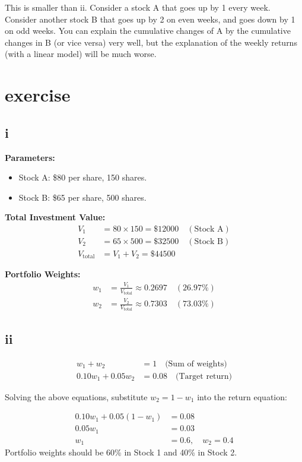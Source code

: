 \documentclass{article}
\begin{document}
This is smaller than ii.
Consider a stock A that goes up by 1 every week.
Consider another stock B that goes up by 2 on even weeks,
and goes down by 1 on odd weeks.
You can explain the cumulative changes of A
by the cumulative changes in B (or vice versa) very well,
but the explanation of the weekly returns (with a linear model) will be much worse.
\section{exercise}
\subsection*{i}
\textbf{Parameters:}
\begin{itemize}
    \item Stock A: \$80 per share, 150 shares.
    \item Stock B: \$65 per share, 500 shares.
\end{itemize}

\textbf{Total Investment Value:}
\begin{align*}
    V_1              & = 80 \times 150 = \$12000 \quad (\text{Stock A}) \\
    V_2              & = 65 \times 500 = \$32500 \quad (\text{Stock B}) \\
    V_{\text{total}} & = V_1 + V_2 = \$44500
\end{align*}

\textbf{Portfolio Weights:}
\begin{align*}
    w_1 & = \frac{V_1}{V_{\text{total}}} \approx 0.2697 \quad (\text{26.97\%}) \\
    w_2 & = \frac{V_2}{V_{\text{total}}} \approx 0.7303 \quad (\text{73.03\%})
\end{align*}
\subsection*{ii}
\begin{align*}
    w_1 + w_2         & = 1 \quad \text{(Sum of weights)}   \\
    0.10w_1 + 0.05w_2 & = 0.08 \quad \text{(Target return)}
\end{align*}

Solving the above equations, substitute \( w_2 = 1 - w_1 \) into the return equation:

\begin{align*}
    0.10w_1 + 0.05(1 - w_1) & = 0.08                 \\
    0.05w_1                 & = 0.03                 \\
    w_1                     & = 0.6, \quad w_2 = 0.4
\end{align*}
Portfolio weights should be 60\% in Stock 1 and 40\% in Stock 2.
\end{document}
